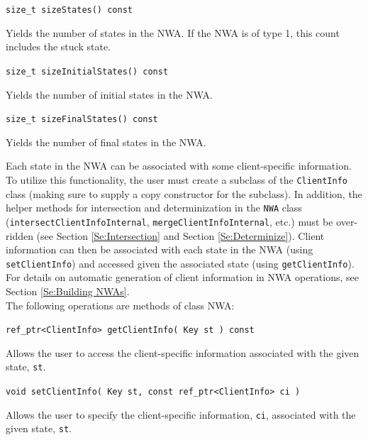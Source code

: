 \documentclass{llncs}
\begin{document}
\begin{description}
  \item\texttt{size\_t sizeStates() const} \nopagebreak

    Yields the number of states in the NWA.  If the NWA is of type 1, this count includes the stuck state.

  \item\texttt{size\_t sizeInitialStates() const} \nopagebreak

    Yields the number of initial states in the NWA.

  \item\texttt{size\_t sizeFinalStates() const} \nopagebreak

    Yields the number of final states in the NWA. \\

\end{description}

Each state in the NWA can be associated with some client-specific information. To utilize this functionality, the user must create a subclass of the \texttt{ClientInfo} class (making sure to supply a copy constructor for the subclass).  In addition, the helper methods for intersection and determinization in the \texttt{NWA} class (\texttt{intersectClientInfoInternal}, \texttt{mergeClientInfoInternal}, etc.) must be over-ridden (see Section \ref{Se:Intersection} and Section \ref{Se:Determinize}).  Client information can then be associated with each state in the NWA (using \texttt{setClientInfo}) and accessed given the associated state (using \texttt{getClientInfo}).  For details on automatic generation of client information in NWA operations, see Section \ref{Se:Building NWAs}. \\  

\noindent The following operations are methods of class NWA:

\begin{description}

  \item\texttt{ref\_ptr<ClientInfo> getClientInfo( Key st ) const} \nopagebreak

    Allows the user to access the client-specific information associated with the given state, \texttt{st}.

  \item\texttt{void setClientInfo( Key st, const ref\_ptr<ClientInfo> ci )} \nopagebreak

    Allows the user to specify the client-specific information, \texttt{ci}, associated with the given state, \texttt{st}. \\

\end{description}
\end{document}
